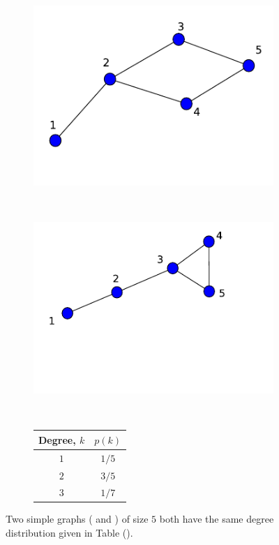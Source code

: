 \documentclass[10pt,a4paper]{article}
\begin{document}
\begin{figure}[H]
	\centering
			\begin{subfigure}[b]{0.35\textwidth}
				\includegraphics[width=\textwidth]{images/sameDegreeDistribution.pdf}
				\caption{}
				\label{samedeg1}
			\end{subfigure}~
			\begin{subfigure}[b]{0.35\textwidth}
				\includegraphics[width=\textwidth]{images/sameDegreeDistribution2.pdf}
				\caption{}
				\label{samedeg2}
			\end{subfigure}~ 
	\begin{subfigure}[b]{.35\textwidth}
		\centering
		\vspace{0pt}
		\setlength{\tabcolsep}{10pt}
		\renewcommand{\arraystretch}{2.0}
		\begin{tabular}{|c|c|}
			\hline 
			Degree, $k$ & $p(k)$ \\
			\hline
			$1$ & $1/5$ \\
			$2$ & $3/5$ \\
			$3$ & $1/7$ \\
			\hline
		\end{tabular}
        \caption{}	
        \label{tabdegdist}
	\end{subfigure}
    \caption{Two simple graphs ( and ) of size $5$ both have the same degree distribution given in Table ().}
\end{figure}
\end{document}
